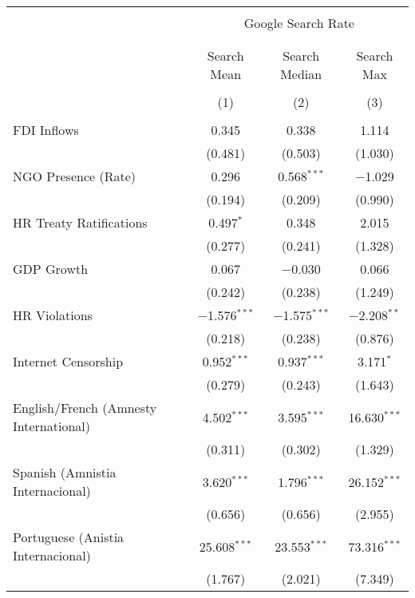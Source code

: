 
\begin{table}[!htbp] \centering 
  \caption{} 
  \label{} 
\begin{tabular}{@{\extracolsep{5pt}}lccc} 
\\[-1.8ex]\hline 
\hline \\[-1.8ex] 
 & \multicolumn{3}{c}{Google Search Rate} \\ 
\cline{2-4} 
\\[-1.8ex] & \multicolumn{3}{c}{ } \\ 
 & Search Mean & Search Median & Search Max \\ 
\\[-1.8ex] & (1) & (2) & (3)\\ 
\hline \\[-1.8ex] 
 FDI Inflows & 0.345 & 0.338 & 1.114 \\ 
  & (0.481) & (0.503) & (1.030) \\ 
  NGO Presence (Rate) & 0.296 & 0.568$^{***}$ & $-$1.029 \\ 
  & (0.194) & (0.209) & (0.990) \\ 
  HR Treaty Ratifications & 0.497$^{*}$ & 0.348 & 2.015 \\ 
  & (0.277) & (0.241) & (1.328) \\ 
  GDP Growth & 0.067 & $-$0.030 & 0.066 \\ 
  & (0.242) & (0.238) & (1.249) \\ 
  HR Violations & $-$1.576$^{***}$ & $-$1.575$^{***}$ & $-$2.208$^{**}$ \\ 
  & (0.218) & (0.238) & (0.876) \\ 
  Internet Censorship & 0.952$^{***}$ & 0.937$^{***}$ & 3.171$^{*}$ \\ 
  & (0.279) & (0.243) & (1.643) \\ 
  English/French (Amnesty International) & 4.502$^{***}$ & 3.595$^{***}$ & 16.630$^{***}$ \\ 
  & (0.311) & (0.302) & (1.329) \\ 
  Spanish (Amnistia Internacional) & 3.620$^{***}$ & 1.796$^{***}$ & 26.152$^{***}$ \\ 
  & (0.656) & (0.656) & (2.955) \\ 
  Portuguese (Anistia Internacional) & 25.608$^{***}$ & 23.553$^{***}$ & 73.316$^{***}$ \\ 
  & (1.767) & (2.021) & (7.349) \\ 

\end{tabular}
\end{table}

